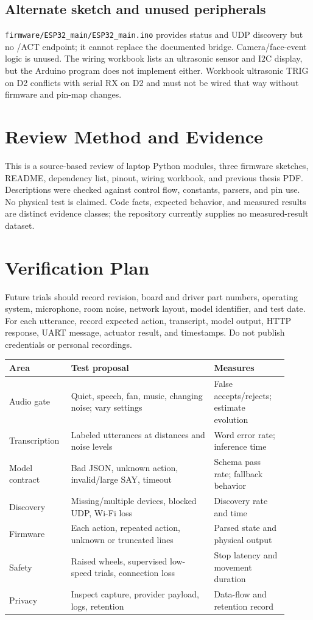 \documentclass[12pt,a4paper]{report}
\begin{document}
\section{Alternate sketch and unused peripherals}
\texttt{firmware/ESP32\_main/ESP32\_main.ino} provides status and UDP discovery but no /ACT endpoint; it cannot replace the documented bridge. Camera/face-event logic is unused. The wiring workbook lists an ultrasonic sensor and I2C display, but the Arduino program does not implement either. Workbook ultrasonic TRIG on D2 conflicts with serial RX on D2 and must not be wired that way without firmware and pin-map changes.
\chapter{Review Method and Evidence}
This is a source-based review of laptop Python modules, three firmware sketches, README, dependency list, pinout, wiring workbook, and previous thesis PDF. Descriptions were checked against control flow, constants, parsers, and pin use. No physical test is claimed. Code facts, expected behavior, and measured results are distinct evidence classes; the repository currently supplies no measured-result dataset.
\chapter{Verification Plan}
Future trials should record revision, board and driver part numbers, operating system, microphone, room noise, network layout, model identifier, and test date. For each utterance, record expected action, transcript, model output, HTTP response, UART message, actuator result, and timestamps. Do not publish credentials or personal recordings.
\begin{longtable}{p{0.18\linewidth}p{0.48\linewidth}p{0.25\linewidth}}\toprule Area & Test proposal & Measures \\\midrule Audio gate & Quiet, speech, fan, music, changing noise; vary settings & False accepts/rejects; estimate evolution \\ Transcription & Labeled utterances at distances and noise levels & Word error rate; inference time \\ Model contract & Bad JSON, unknown action, invalid/large SAY, timeout & Schema pass rate; fallback behavior \\ Discovery & Missing/multiple devices, blocked UDP, Wi-Fi loss & Discovery rate and time \\ Firmware & Each action, repeated action, unknown or truncated lines & Parsed state and physical output \\ Safety & Raised wheels, supervised low-speed trials, connection loss & Stop latency and movement duration \\ Privacy & Inspect capture, provider payload, logs, retention & Data-flow and retention record \\\bottomrule\end{longtable}
\end{document}
